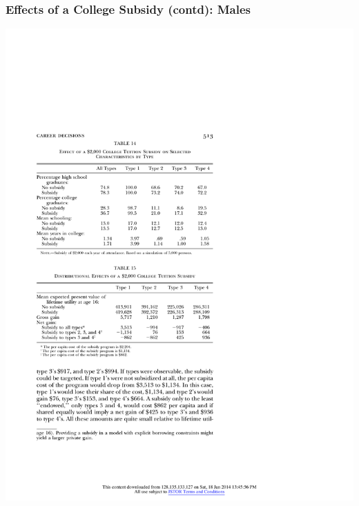 \begin{frame}
	\frametitle{Effects of a College Subsidy (contd): Males}
		\includegraphics{tab-figs/table15_1997}
\end{frame}

